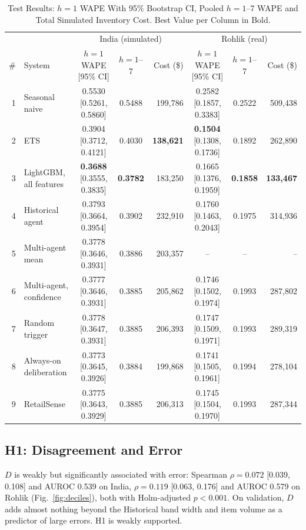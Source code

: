 \documentclass[conference]{IEEEtran}
\begin{document}
\begin{table}[t]
\caption{Test Results: $h=1$ WAPE With 95\% Bootstrap CI, Pooled $h=1$--7 WAPE and Total Simulated
Inventory Cost. Best Value per Column in Bold.}
\label{tab:results}
\centering
\scriptsize
\setlength{\tabcolsep}{4pt}
\begin{tabular}{@{}rl ccr ccr@{}}
\toprule
 & & \multicolumn{3}{c}{India (simulated)} & \multicolumn{3}{c}{Rohlik (real)} \\
\cmidrule(lr){3-5}\cmidrule(l){6-8}
\# & System & $h=1$ WAPE [95\% CI] & $h=1$--7 & Cost (\$) & $h=1$ WAPE [95\% CI] & $h=1$--7 & Cost (\$) \\
\midrule
1 & Seasonal naive          & 0.5530 [0.5261, 0.5860] & 0.5488 & 199,786 & 0.2582 [0.1857, 0.3383] & 0.2522 & 509,438 \\
2 & ETS                     & 0.3904 [0.3712, 0.4121] & 0.4030 & \textbf{138,621} & \textbf{0.1504} [0.1308, 0.1736] & 0.1892 & 262,890 \\
3 & LightGBM, all features  & \textbf{0.3688} [0.3555, 0.3835] & \textbf{0.3782} & 183,250 & 0.1665 [0.1376, 0.1959] & \textbf{0.1858} & \textbf{133,467} \\
4 & Historical agent        & 0.3793 [0.3664, 0.3954] & 0.3902 & 232,910 & 0.1760 [0.1463, 0.2043] & 0.1975 & 314,936 \\
5 & Multi-agent mean        & 0.3778 [0.3646, 0.3931] & 0.3886 & 203,357 & -- & -- & -- \\
6 & Multi-agent, confidence & 0.3777 [0.3646, 0.3931] & 0.3885 & 205,862 & 0.1746 [0.1502, 0.1974] & 0.1993 & 287,802 \\
7 & Random trigger          & 0.3778 [0.3647, 0.3931] & 0.3885 & 206,393 & 0.1747 [0.1509, 0.1971] & 0.1993 & 289,319 \\
8 & Always-on deliberation  & 0.3773 [0.3645, 0.3926] & 0.3884 & 199,868 & 0.1741 [0.1505, 0.1961] & 0.1994 & 278,104 \\
9 & RetailSense             & 0.3775 [0.3643, 0.3929] & 0.3885 & 206,313 & 0.1745 [0.1504, 0.1970] & 0.1993 & 287,344 \\
\bottomrule
\end{tabular}
\end{table}

\subsection{H1: Disagreement and Error}
$D$ is weakly but significantly associated with error: Spearman $\rho=0.072$ [0.039, 0.108] and AUROC
0.539 on India, $\rho=0.119$ [0.063, 0.176] and AUROC 0.579 on Rohlik (Fig.~\ref{fig:deciles}), both
with Holm-adjusted $p<0.001$. On validation, $D$ adds almost nothing beyond the Historical band width
and item volume as a predictor of large errors. H1 is weakly supported.
\end{document}
